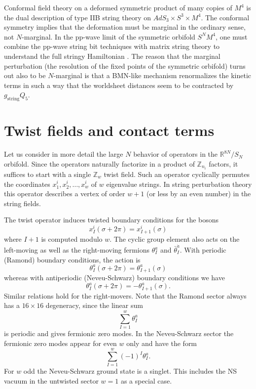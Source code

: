 \documentclass[nohyper,12pt,letterpaper]{JHEP3}
\def\IZ{{\mathbb Z}}           %
\def\IR{{\mathbb R}}
\def \eqn#1#2{\begin{equation}#2\label{#1}\end{equation}}
\def \gs{g_{\mathrm{string}}}
\begin{document}
Conformal field theory on a deformed symmetric product of many copies
of $M^4$ is the dual description of type IIB string theory on $AdS_3
\times S^3 \times M^4$. The conformal symmetry implies that the
deformation must be marginal in the ordinary sense, not
$N$-marginal. In the pp-wave limit of the symmetric orbifold $S^N
M^4$, one must combine the pp-wave string bit techniques \cite{bmn}
with matrix string theory to understand the full stringy Hamiltonian
\cite{goms}. The reason that the marginal perturbation (the resolution of 
the fixed points of the symmetric orbifold) turns out also to be
$N$-marginal is that a BMN-like mechanism renormalizes the kinetic terms 
in such a way that the worldsheet distances seem to be contracted
by $\gs Q_5$.

\section{Twist fields and contact terms\label{twistfields}}

Let us consider in more detail the large $N$ behavior of operators in
the $\IR^{8N}/S_N$ orbifold. Since the operators naturally factorize
in a product of $\IZ_{n_i}$ factors, it suffices to start with a
single $\IZ_w$ twist field.  Such an operator cyclically permutes the
coordinates $x_1^i, x_2^i, \dots , x_w^i$ of $w$ eigenvalue strings.
In string perturbation theory this operator describes a vertex of
order $w+1$ (or less by an even number) in the string fields.

The twist operator induces twisted boundary conditions for the bosons
%
\eqn{bosontwi}{x_I^i(\sigma+2\pi)=x^i_{I+1}(\sigma)}
%
where $I+1$ is computed modulo $w$. The cyclic group element also acts 
on the left-moving as well as the right-moving  fermions $\theta^a_I$
and $\bar \theta^{\dot a}_I$. With periodic (Ramond) boundary conditions, 
the action is
%
\eqn{ramond}{\theta^a_I(\sigma+2\pi)=\theta_{I+1}^a(\sigma)}
%
whereas with antiperiodic (Neveu-Schwarz) boundary conditions we have
%
\eqn{nsw}{\theta^a_I(\sigma+2\pi)=-\theta_{I+1}^a(\sigma).}
%
Similar relations hold for the right-movers. Note that the Ramond sector 
always has a $16\times 16$ degeneracy, since the linear sum
%
\eqn{linearsum}{\sum_{I=1}^w  \theta^a_I}
%
is periodic and gives fermionic zero modes. In the Neveu-Schwarz sector
the fermionic zero modes appear for even $w$ only and have the form
%
\eqn{linearsumns}{\sum_{I=1}^w (-1)^I \theta^a_I.}
%
For $w$ odd the Neveu-Schwarz ground state is a singlet. This includes the 
NS vacuum in the untwisted sector $w=1$ as a special case.
\end{document}
